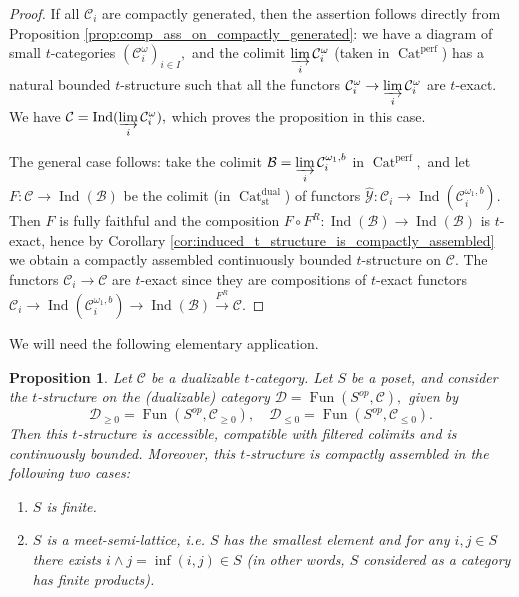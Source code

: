 \documentclass[11pt,leqno]{amsart}
\newtheorem{prop}[theo]{Proposition}
\numberwithin{equation}{section}
\newcommand{\indlim}[1][]{\mathop{\varinjlim}\limits_{#1}}
\newcommand{\xto}{\xrightarrow}
\newcommand{\Cat}{\operatorname{Cat}}
\newcommand{\st}{\operatorname{st}}
\newcommand{\dual}{\operatorname{dual}}
\newcommand{\cD}{{\mathcal D}}
\newcommand{\cB}{{\mathcal B}}
\newcommand{\cC}{{\mathcal C}}
\newcommand{\cY}{{\mathcal Y}}
\newcommand{\Fun}{\operatorname{Fun}}
\newcommand{\perf}{\operatorname{perf}}
\newcommand{\Ind}{\operatorname{Ind}}
\begin{document}
\begin{proof}
If all $\cC_i$ are compactly generated, then the assertion follows directly from Proposition \ref{prop:comp_ass_on_compactly_generated}: we have a diagram of small $t$-categories $(\cC_i^{\omega})_{i\in I},$ and the colimit $\indlim[i]\cC_i^{\omega}$ (taken in $\Cat^{\perf}$) has a natural bounded $t$-structure such that all the functors $\cC_i^{\omega}\to\indlim[i]\cC_i^{\omega}$ are $t$-exact. We have $\cC=\Ind(\indlim[i]\cC_i^{\omega}),$ which proves the proposition in this case.

The general case follows: take the colimit $\cB=\indlim[i]\cC_i^{\omega_1,b}$ in $\Cat^{\perf},$ and let $F:\cC\to\Ind(\cB)$ be the colimit (in $\Cat_{\st}^{\dual}$) of functors $\hat{\cY}:\cC_i\to\Ind(\cC_i^{\omega_1,b}).$ Then $F$ is fully faithful and the composition $F\circ F^R:\Ind(\cB)\to\Ind(\cB)$ is $t$-exact, hence by Corollary \ref{cor:induced_t_structure_is_compactly_assembled} we obtain a compactly assembled continuously bounded $t$-structure on $\cC.$ The functors $\cC_i\to\cC$ are $t$-exact since they are compositions of $t$-exact functors $\cC_i\to\Ind(\cC_i^{\omega_1,b})\to\Ind(\cB)\xto{F^R}\cC.$  
\end{proof}

We will need the following elementary application.


\begin{prop}\label{prop:functors_from_poset_to_dualizable_t_category}
Let $\cC$ be a dualizable $t$-category. Let $S$ be a poset, and consider the $t$-structure on the (dualizable) category $\cD=\Fun(S^{op},\cC),$ given by
\begin{equation*}
\cD_{\geq 0}=\Fun(S^{op},\cC_{\geq 0}),\quad \cD_{\leq 0}=\Fun(S^{op},\cC_{\leq 0}).
\end{equation*}
Then this $t$-structure is accessible, compatible with filtered colimits and is continuously bounded. Moreover, this $t$-structure is compactly assembled in the following two cases: 

\begin{enumerate}[label=(\roman*),ref=(\roman*)]
	\item $S$ is finite. \label{finite_poset}
    \item $S$ is a meet-semi-lattice, i.e. $S$ has the smallest element and for any $i,j\in S$ there exists $i\wedge j=\inf(i,j)\in S$ (in other words, $S$ considered as a category has finite products). \label{meet_semilattice}
\end{enumerate}
\end{prop}
\end{document}
